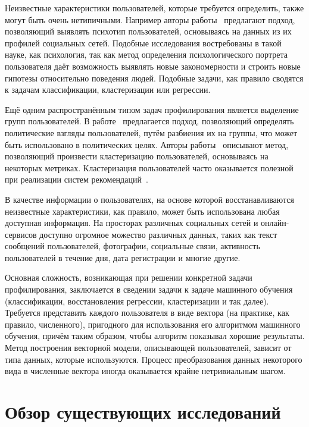 Неизвестные характеристики пользователей, которые требуется
определить, также могут быть очень нетипичными. Например
авторы работы~\cite{schwartz2013personality} предлагают
подход, позволяющий выявлять психотип пользователей, основываясь
на данных из их профилей социальных сетей. Подобные исследования
востребованы в такой науке, как психология, так как метод
определения психологического портрета пользователя даёт
возможность выявлять новые закономерности и строить новые
гипотезы относительно поведения людей. Подобные задачи,
как правило сводятся к задачам классификации, кластеризации
или регрессии.

Ещё одним распространённым типом задач профилирования является
выделение групп пользователей. В работе~\cite{barbera2015tweeting}
предлагается подход, позволяющий определять политические взгляды
пользователей, путём разбиения их на группы, что может быть
использовано в политических целях. Авторы 
работы~\cite{maia2008identifying} описывают метод, позволяющий
произвести кластеризацию пользователей, основываясь на некоторых
метриках. Кластеризация пользователей часто оказывается полезной
при реализации систем рекомендаций~\cite{sarwar2002recommender}.

В качестве информации о пользователях, на основе которой
восстанавливаются неизвестные характеристики, как правило,
может быть использована любая доступная информация. На просторах
различных социальных сетей и онлайн-сервисов доступно огромное
можество различных данных, таких как текст сообщений пользователей,
фотографии, социальные связи, активность пользователей в течение
дня, дата регистрации и многие другие.

Основная сложность, возникающая при решении конкретной задачи
профилирования, заключается в сведении задачи к задаче машинного
обучения (классификации, восстановления регрессии, кластеризации и
так далее). Требуется представить каждого пользователя в
виде вектора (на практике, как правило, численного), пригодного для
использования его алгоритмом машинного обучения, причём таким образом,
чтобы алгоритм показывал хорошие результаты. Метод построения векторной
модели, описывающей пользователей, зависит от типа данных,
которые используются. Процесс преобразования данных некоторого вида в
численные вектора иногда оказывается крайне нетривиальным шагом.

\section{Обзор существующих исследований}
\label{sec:previous_work}

